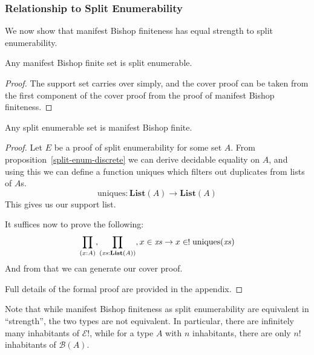 \subsubsection{Relationship to Split Enumerability}
We now show that manifest Bishop finiteness has equal strength to split
enumerability.
\begin{lemma}
  Any manifest Bishop finite set is split enumerable.
\end{lemma}
\begin{proof}
  The support set carries over simply, and the cover proof can be taken from the
  first component of the cover proof from the proof of manifest Bishop
  finiteness.
\end{proof}
\begin{theorem} \label{split-enum-to-manifest-bishop}
  Any split enumerable set is manifest Bishop finite.
\end{theorem}
\begin{proof}
  Let \(E\) be a proof of split enumerability for some set \(A\).
  From proposition~\ref{split-enum-discrete} we can derive decidable equality on
  \(A\), and using this we can define a function \(\text{uniques}\) which filters
  out duplicates from lists of \(A\)s.
  \begin{equation}
    \text{uniques} : \textbf{List}(A) \rightarrow \textbf{List}(A)
  \end{equation}
  This gives us our support list.

  It suffices now to prove the following:
  \begin{equation}
    \prod_{(x : A)} , \prod_{(\mathit{xs} : \textbf{List}(A))} , x \in \mathit{xs} \rightarrow x \inunique \text{uniques}(\mathit{xs})
  \end{equation}
  And from that we can generate our cover proof.

  Full details of the formal proof are provided in the appendix.
\end{proof}
Note that while manifest Bishop finiteness as split enumerability are equivalent
in ``strength'', the two types are not equivalent.
In particular, there are infinitely many inhabitants of \(\mathcal{E}!\), while
for a type \(A\) with \(n\) inhabitants, there are only \(n!\) inhabitants of
\(\mathcal{B}(A)\).
